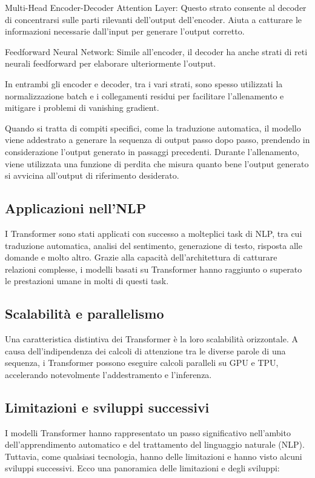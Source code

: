 Multi-Head Encoder-Decoder Attention Layer: Questo strato consente al decoder di concentrarsi sulle parti rilevanti dell'output dell'encoder. Aiuta a catturare le informazioni necessarie dall'input per generare l'output corretto.

Feedforward Neural Network: Simile all'encoder, il decoder ha anche strati di reti neurali feedforward per elaborare ulteriormente l'output.

In entrambi gli encoder e decoder, tra i vari strati, sono spesso utilizzati la normalizzazione batch e i collegamenti residui per facilitare l'allenamento e mitigare i problemi di vanishing gradient.

Quando si tratta di compiti specifici, come la traduzione automatica, il modello viene addestrato a generare la sequenza di output passo dopo passo, prendendo in considerazione l'output generato in passaggi precedenti. Durante l'allenamento, viene utilizzata una funzione di perdita che misura quanto bene l'output generato si avvicina all'output di riferimento desiderato.

\subsection{Applicazioni nell'NLP}
I Transformer sono stati applicati con successo a molteplici task di NLP, tra cui traduzione automatica, analisi del sentimento, generazione di testo, risposta alle domande e molto altro. Grazie alla capacità dell'architettura di catturare relazioni complesse, i modelli basati su Transformer hanno raggiunto o superato le prestazioni umane in molti di questi task.

\subsection{Scalabilità e parallelismo}
Una caratteristica distintiva dei Transformer è la loro scalabilità orizzontale. A causa dell'indipendenza dei calcoli di attenzione tra le diverse parole di una sequenza, i Transformer possono eseguire calcoli paralleli su GPU e TPU, accelerando notevolmente l'addestramento e l'inferenza.

\subsection{Limitazioni e sviluppi successivi}
I modelli Transformer hanno rappresentato un passo significativo nell'ambito dell'apprendimento automatico e del trattamento del linguaggio naturale (NLP). Tuttavia, come qualsiasi tecnologia, hanno delle limitazioni e hanno visto alcuni sviluppi successivi. Ecco una panoramica delle limitazioni e degli sviluppi:

